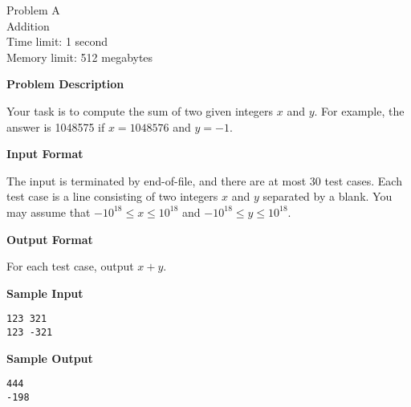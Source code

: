 \documentclass[11pt]{article}
\begin{document}
\begin{center}
    {\LARGE Problem A}\\
    {\Large Addition}\\
    {Time limit: 1 second}\\
    {Memory limit: 512 megabytes}
\end{center}

\textbf{\large Problem Description}

Your task is to compute the sum of two given integers $x$ and $y$. For example,
the answer is 1048575 if $x=1048576$ and $y=-1$.

\textbf{\large Input Format}

The input is terminated by end-of-file, and there are at most 30 test cases.
Each test case is a line consisting of two integers $x$ and $y$ separated by
a blank. You may assume that $-10^{18}\le x \le 10^{18}$ and 
$-10^{18}\le y \le 10^{18}$.

\textbf{\large Output Format}

For each test case, output $x+y$.

\textbf{\large Sample Input}

\begin{verbatim}
123 321
123 -321
\end{verbatim}

\textbf{\large Sample Output}
\begin{verbatim}
444
-198
\end{verbatim}
\end{document}
